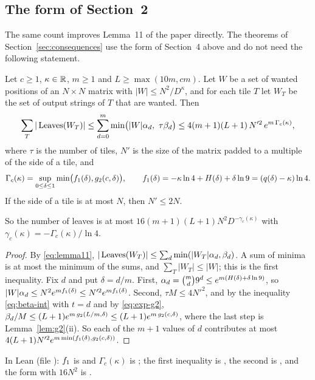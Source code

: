 \subsection{The form of Section~2}

The same count improves Lemma~11 of the paper directly.  The theorems of
Section~\ref{sec:consequences} use the form of Section~4 above and do not need
the following statement.

\begin{proposition}\label{prop:lemmaA}
Let \(c\ge1\), \(\kappa\in\mathbb{R}\), \(m\ge1\) and \(L\ge\max(10m,cm)\).  Let \(W\)
be a set of wanted positions of an \(N\times N\) matrix with
\(|W|\le N^{2}/D^{\kappa}\), and for each tile \(T\) let \(W_T\) be the set of
output strings of \(T\) that are wanted.  Then
\[
  \sum_T|\Leaves(W_T)|\le\sum_{d=0}^{m}\min\bigl(|W|\alpha_d,\ \tau\beta_d\bigr)
  \le4(m+1)(L+1)\,N'^{2}\,e^{m\,\Gamma_c(\kappa)},
\]
where \(\tau\) is the number of tiles, \(N'\) is the size of the matrix padded
to a multiple of the side of a tile, and
\[
  \Gamma_c(\kappa)=\sup_{0\le\delta\le1}
    \min\bigl(f_{1}(\delta),g_{2}(c,\delta)\bigr),\qquad
  f_{1}(\delta)=-\kappa\ln 4+H(\delta)+\delta\ln 9=(q(\delta)-\kappa)\ln 4 .
\]
If the side of a tile is at most \(N\), then \(N'\le2N\).
\end{proposition}

So the number of leaves is at most \(16(m+1)(L+1)N^{2}D^{-\gamma_c(\kappa)}\) with
\(\gamma_c(\kappa)=-\Gamma_c(\kappa)/\ln 4\).

\begin{proof}
By \eqref{eq:lemma11}, \(|\operatorname{Leaves}(W_T)|\le\sum_d\min(|W_T|\alpha_d,\beta_d)\).
A sum of minima is at most the minimum of the sums, and
\(\sum_T|W_T|\le|W|\); this is the first inequality.  Fix \(d\) and put
\(\delta=d/m\).  First, \(\alpha_d=\binom{m}{d}9^{d}\le
e^{m(H(\delta)+\delta\ln 9)}\), so
\(|W|\alpha_d\le N^{2}e^{mf_{1}(\delta)}\le N'^{2}e^{mf_{1}(\delta)}\).
Second, \(\tau M\le4N'^{2}\), and by the inequality \eqref{eq:beta-int} with
\(t=d\) and by \eqref{eq:exp-g2},
\(\beta_d/M\le(L+1)e^{m\,g_{2}(L/m,\delta)}\le(L+1)e^{m\,g_{2}(c,\delta)}\), where
the last step is Lemma~\ref{lem:g2}(ii).  So each of the \(m+1\) values of \(d\)
contributes at most
\(4(L+1)N'^{2}e^{m\min(f_{1}(\delta),g_{2}(c,\delta))}\).
\end{proof}

In Lean (file ): \(f_{1}\) is  and
\(\Gamma_c(\kappa)\) is ; the first inequality is
, the second is
, and the form with \(16N^{2}\) is
.

